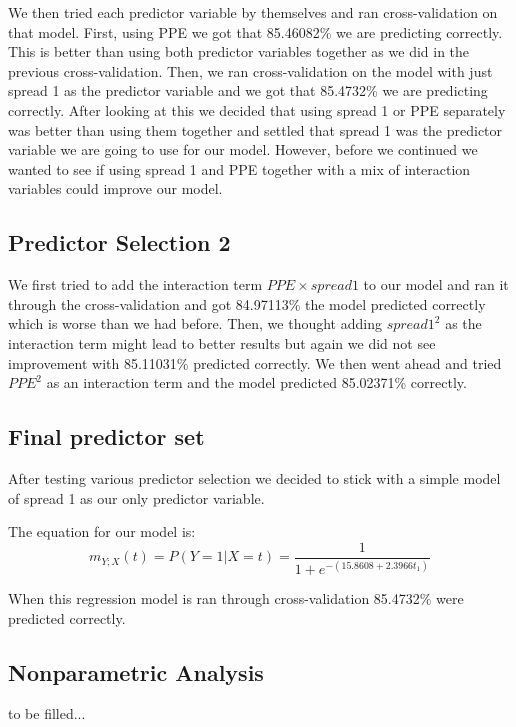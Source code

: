 \documentclass{article}
\begin{document}
We then tried each predictor variable by themselves and ran cross-validation
on that model. First, using PPE we got that 85.46082\% we are predicting
correctly. This is better than using both predictor variables together as
we did in the previous cross-validation. Then, we ran cross-validation on
the model with just spread 1 as the predictor variable and we got that 85.4732\%
we are predicting correctly. After looking at this we decided that using
spread 1 or PPE separately was better than using them together and settled
that spread 1 was the predictor variable we are going to use for our model.
However, before we continued we wanted to see if using spread 1 and PPE together
with a mix of interaction variables could improve our model.

\subsection{Predictor Selection 2}

We first tried to add the interaction term $PPE \times spread 1$ to our model
and ran it through the cross-validation and got 84.97113\% the model predicted
correctly which is worse than we had before. Then, we thought adding $spread1^{2}$
as the interaction term might lead to better results but again we did not see
improvement with 85.11031\% predicted correctly. We then went ahead and
tried $PPE^{2}$ as an interaction term and the model predicted 85.02371\% correctly.

\subsection{Final predictor set}

After testing various predictor selection we decided to stick with a
simple model of spread 1 as our only predictor variable.

The equation for our model is:
\begin{equation}
\label{logit2}
m_{Y;X}(t) = P(Y = 1 | X = t) = \frac{1}{1+e^{-(15.8608+2.3966
t_1)}}
\end{equation}

When this regression model is ran through cross-validation 85.4732\%
were predicted correctly.  

\subsection{Nonparametric Analysis}

to be filled...
\end{document}
